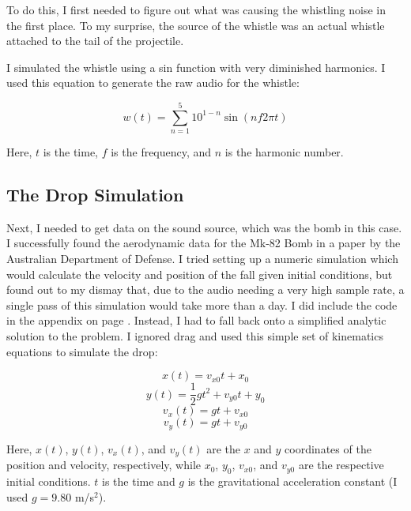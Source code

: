 \documentclass[%
 reprint,
 amsmath,amssymb,
 aps,
]{revtex4-1}
\begin{document}
To do this, I first needed to figure out what was causing the whistling noise in the first place. To my surprise, the source of the whistle was an actual whistle attached to the tail of the projectile.

I simulated the whistle using a sin function with very diminished harmonics. I used this equation to generate the raw audio for the whistle:

\begin{equation}\label{eq:whistle}
w(t) = \sum_{n=1}^{5} 10^{1-n} \sin{(n f 2 \pi t)}
\end{equation}

Here, $t$ is the time, $f$ is the frequency, and $n$ is the harmonic number.

\subsection{\label{sec:drop}The Drop Simulation}

Next, I needed to get data on the sound source, which was the bomb in this case. I successfully found the aerodynamic data for the Mk-82 Bomb in a paper by the Australian Department of Defense\cite{mk82}. I tried setting up a numeric simulation which would calculate the velocity and position of the fall given initial conditions, but found out to my dismay that, due to the audio needing a very high sample rate, a single pass of this simulation would take more than a day. I did include the code in the appendix on page \pageref{sec:numsim}. Instead, I had to fall back onto a simplified analytic solution to the problem. I ignored drag and used this simple set of kinematics equations to simulate the drop:

\begin{equation}\label{eq:dropx}
x(t) = v_{x0} t + x_0
\end{equation}
\begin{equation}\label{eq:dropy}
y(t) = \frac{1}{2}gt^2+ v_{y0} t + y_0
\end{equation}
\begin{equation}\label{eq:dropvx}
v_x(t) = gt + v_{x0}
\end{equation}
\begin{equation}\label{eq:dropvy}
v_y(t) = gt + v_{y0}
\end{equation}

Here, $x(t)$, $y(t)$, $v_x(t)$, and $v_y(t)$ are the $x$ and $y$ coordinates of the position and velocity, respectively, while $x_0$, $y_0$, $v_{x0}$, and $v_{y0}$ are the respective initial conditions. $t$ is the time and $g$ is the gravitational acceleration constant (I used $g = 9.80$ m/s$^2$).
\end{document}
